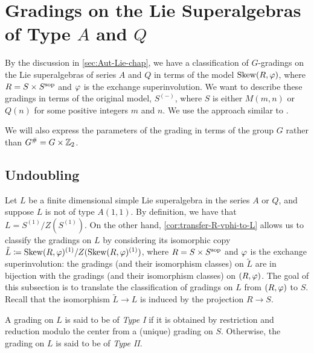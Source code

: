 \section{Gradings on the Lie Superalgebras of Type \texorpdfstring{$A$ and $Q$}{A and Q}}

By the discussion in \cref{sec:Aut-Lie-chap}, we have a classification of $G$-gradings on the Lie superalgebras of series $A$ and $Q$ in terms of the model $\operatorname{Skew}(R, \varphi)$, where $R = S\times S^{\mathrm{sop}}$ and $\varphi$ is the exchange superinvolution. 
We want to describe these gradings in terms of the original model, $S^{(-)}$, where $S$ is either $M(m,n)$ or $Q(n)$ for some positive integers $m$ and $n$. 
We use the approach similar to \cite[Appendix]{paper-adrian}. 

We will also express the parameters of the grading in terms of the group $G$ rather than $G^\# =G \times \mathbb{Z}_2$. 
 
\subsection{Undoubling}\label{ssec:undoubling}

Let $L$ be a finite dimensional simple Lie superalgebra in the series $A$ or $Q$, and suppose $L$ is not of type $A(1,1)$. 
By definition, we have that $L = S^{(1)}/Z(S^{(1)})$. 
On the other hand, \cref{cor:transfer-R-vphi-to-L} allows us to classify the gradings on $L$ by considering its isomorphic copy $\tilde L \coloneqq \operatorname{Skew}(R, \varphi)^{(1)}/Z(\operatorname{Skew}(R, \varphi)^{(1)})$, where $R = S\times S^{\mathrm{sop}}$ and $\varphi$ is the exchange superinvolution:
the gradings (and their isomorphism classes) on $\tilde L$ are in bijection with the gradings (and their isomorphism classes) on $(R, \varphi)$. 
The goal of this subsection is to translate the classification of gradings on $L$ from $(R, \varphi)$ to $S$. 
Recall that the isomorphism $\tilde L \to L$ is induced by the projection $R \to S$. 

\begin{defi}\label{defi:types-I-and-II}
    A grading on $L$ is said to be of \emph{Type I} if it is obtained by restriction and reduction modulo the center from a (unique) grading on $S$. 
    Otherwise, the grading on $L$ is said to be of \emph{Type II}. 
\end{defi}

